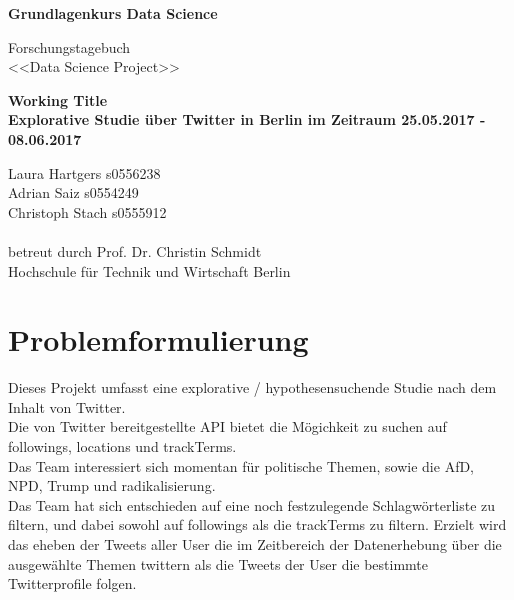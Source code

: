 \documentclass[12pt, 
	a4paper, 
	oneside, 
	leqno]{scrreprt}
\begin{document}
\begin{titlepage}
\begin{center}

\begin{Huge}

\textbf{Grundlagenkurs Data Science}
\newline\newline
\end{Huge}

\begin{LARGE}
Forschungstagebuch \\
<<Data Science Project>> \\
\end{LARGE}
\vfill
\textbf{Working Title \\ Explorative Studie über Twitter in Berlin im Zeitraum 25.05.2017 - 08.06.2017}

\end{center}
\vfill
Laura Hartgers s0556238 \\
Adrian Saiz s0554249 \\
Christoph Stach s0555912 \\
\\
betreut durch Prof. Dr. Christin Schmidt \\
Hochschule für Technik und Wirtschaft Berlin
\end{titlepage}

\setcounter{tocdepth}{2} %
\tableofcontents
\pagebreak

\chapter{Problemformulierung}

Dieses Projekt umfasst eine explorative / hypothesensuchende Studie nach dem Inhalt von Twitter.
\\
Die von Twitter bereitgestellte API bietet die Mögichkeit zu suchen auf followings, locations und trackTerms.
\\
Das Team interessiert sich momentan für politische Themen, sowie die AfD, NPD, Trump und radikalisierung. 
\\
Das Team hat sich entschieden auf eine noch festzulegende Schlagwörterliste zu filtern, und dabei sowohl auf followings als die trackTerms zu filtern. Erzielt wird das eheben der Tweets aller User die im Zeitbereich der Datenerhebung über die ausgewählte Themen twittern als die Tweets der User die bestimmte Twitterprofile folgen.
\end{document}
